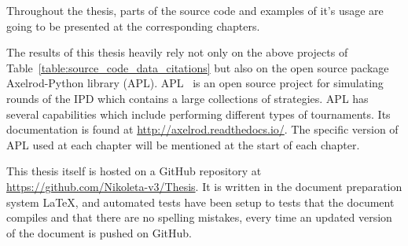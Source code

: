 Throughout the thesis, parts of the source code and examples of it's usage are
going to be presented at the corresponding chapters.

The results of this thesis heavily rely not only on the above projects of
Table~\ref{table:source_code_data_citations} but also on the open source package
Axelrod-Python library (APL). APL~\cite{axelrodproject} is an open source
project for simulating rounds of the IPD which contains a large collections of
strategies. APL has several capabilities which include performing different
types of tournaments. Its documentation is found at
\url{http://axelrod.readthedocs.io/}. The specific version of APL used at each
chapter will be mentioned at the start of each chapter.

This thesis itself is hosted on a GitHub repository at
\url{https://github.com/Nikoleta-v3/Thesis}. It is written in the document
preparation system \LaTeX, and automated tests have been setup to tests
that the document compiles and that there are no spelling mistakes, every time
an updated version of the document is pushed on GitHub.